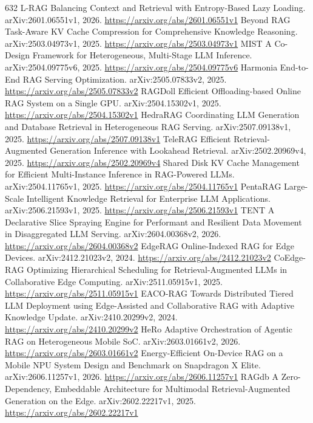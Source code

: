 \documentclass[11pt]{article}
\begin{document}
\begin{thebibliography}{632}
 L-RAG Balancing Context and Retrieval with Entropy-Based Lazy Loading. arXiv:2601.06551v1, 2026. \url{https://arxiv.org/abs/2601.06551v1}
 Beyond RAG Task-Aware KV Cache Compression for Comprehensive Knowledge Reasoning. arXiv:2503.04973v1, 2025. \url{https://arxiv.org/abs/2503.04973v1}
 MIST A Co-Design Framework for Heterogeneous, Multi-Stage LLM Inference. arXiv:2504.09775v6, 2025. \url{https://arxiv.org/abs/2504.09775v6}
 Harmonia End-to-End RAG Serving Optimization. arXiv:2505.07833v2, 2025. \url{https://arxiv.org/abs/2505.07833v2}
 RAGDoll Efficient Offloading-based Online RAG System on a Single GPU. arXiv:2504.15302v1, 2025. \url{https://arxiv.org/abs/2504.15302v1}
 HedraRAG Coordinating LLM Generation and Database Retrieval in Heterogeneous RAG Serving. arXiv:2507.09138v1, 2025. \url{https://arxiv.org/abs/2507.09138v1}
 TeleRAG Efficient Retrieval-Augmented Generation Inference with Lookahead Retrieval. arXiv:2502.20969v4, 2025. \url{https://arxiv.org/abs/2502.20969v4}
 Shared Disk KV Cache Management for Efficient Multi-Instance Inference in RAG-Powered LLMs. arXiv:2504.11765v1, 2025. \url{https://arxiv.org/abs/2504.11765v1}
 PentaRAG Large-Scale Intelligent Knowledge Retrieval for Enterprise LLM Applications. arXiv:2506.21593v1, 2025. \url{https://arxiv.org/abs/2506.21593v1}
 TENT A Declarative Slice Spraying Engine for Performant and Resilient Data Movement in Disaggregated LLM Serving. arXiv:2604.00368v2, 2026. \url{https://arxiv.org/abs/2604.00368v2}
 EdgeRAG Online-Indexed RAG for Edge Devices. arXiv:2412.21023v2, 2024. \url{https://arxiv.org/abs/2412.21023v2}
 CoEdge-RAG Optimizing Hierarchical Scheduling for Retrieval-Augmented LLMs in Collaborative Edge Computing. arXiv:2511.05915v1, 2025. \url{https://arxiv.org/abs/2511.05915v1}
 EACO-RAG Towards Distributed Tiered LLM Deployment using Edge-Assisted and Collaborative RAG with Adaptive Knowledge Update. arXiv:2410.20299v2, 2024. \url{https://arxiv.org/abs/2410.20299v2}
 HeRo Adaptive Orchestration of Agentic RAG on Heterogeneous Mobile SoC. arXiv:2603.01661v2, 2026. \url{https://arxiv.org/abs/2603.01661v2}
 Energy-Efficient On-Device RAG on a Mobile NPU System Design and Benchmark on Snapdragon X Elite. arXiv:2606.11257v1, 2026. \url{https://arxiv.org/abs/2606.11257v1}
 RAGdb A Zero-Dependency, Embeddable Architecture for Multimodal Retrieval-Augmented Generation on the Edge. arXiv:2602.22217v1, 2025. \url{https://arxiv.org/abs/2602.22217v1}

\end{thebibliography}
\end{document}

